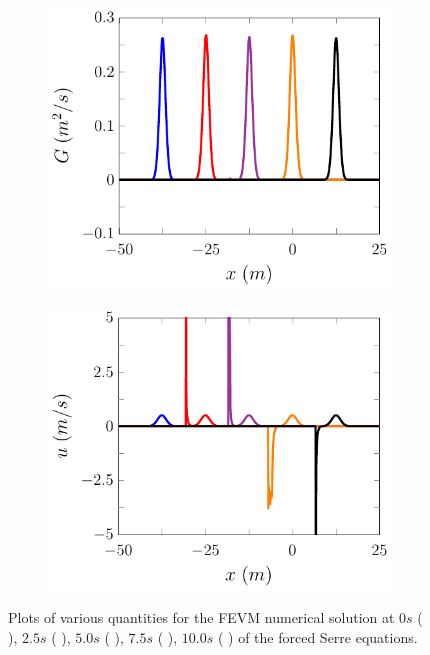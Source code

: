 \begin{figure}
\begin{subfigure}{0.5\textwidth}
	\end{subfigure}
	\begin{subfigure}{0.5\textwidth}
		\includegraphics[width=\textwidth]{./chp5/figures/Forced/Dry/P2P/FEVMExG.pdf}
		\vspace{0.5cm}
	\end{subfigure}%
	\begin{subfigure}{0.5\textwidth}
		\includegraphics[width=\textwidth]{./chp5/figures/Forced/Dry/P2P/FEVMExu.pdf}
		\vspace{0.5cm}
	\end{subfigure}
	\caption{Plots of various quantities for the FEVM numerical solution at $0s$ ({\color{blue} \solidrule}), $2.5s$ ({\color{red} \solidrule}), $5.0s$ ({\color{violet!80!white} \solidrule}), $7.5s$ ({\color{orange} \solidrule}), $10.0s$ ({\color{black} \solidrule}) of the forced Serre equations.}
	\label{fig:ForcedFEVMP2PExAll}
\end{figure}

